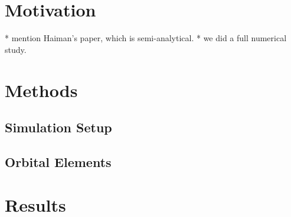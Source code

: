 \documentclass[useAMS,usenatbib]{mn2e}
\begin{document}
\section{Motivation}
* mention Haiman's paper, which is semi-analytical. 
* we did a full numerical study.

\section{Methods}

\subsection{Simulation Setup}

\subsection{Orbital Elements}

\section{Results}
\end{document}
